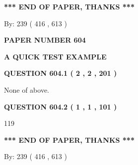 \documentclass[12pt]{article}
\begin{document}
   
   
   
   
\vspace{1.0in} 
{\textbf{\large{ *** END OF PAPER, THANKS *** }}} 
   
   
\hspace{1.0in} By: 
 239 ( 416 ,  613 )
   
   
   
   
\newpage 
\setcounter{page}{ 
   604001 } 
   
   
   
   
 {\textbf{ \Large{ PAPER NUMBER  604  }}}
   
   
\vspace{0.2in}
   
   
   
   
   
   
 \vspace{0.2in}
{\LARGE {\textbf{ A QUICK TEST EXAMPLE}}}
   
   
  
\vspace{0.2in}
  
{\textbf{\Large{QUESTION
604.1 
 ( 2 , 2 , 201 )
}}}
  
  
 
 
\noindent{}
 
 
 None of above.
 
 
 
 
  
\vspace{0.2in}
  
{\textbf{\Large{QUESTION
604.2 
 ( 1 , 1 , 101 )
}}}
  
  
 
 
\noindent{}

119
 
 
   
   
 \vspace{0.2in}
 
   
   
   
   
\vspace{1.0in} 
{\textbf{\large{ *** END OF PAPER, THANKS *** }}} 
   
   
\hspace{1.0in} By: 
 239 ( 416 ,  613 )
   
\end{document}

